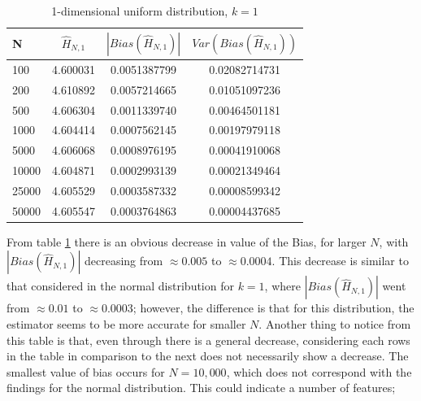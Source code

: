 \documentclass{article}
\begin{document}
\begin{table}
\caption{1-dimensional uniform distribution, $k=1$} \label{uniform_k=1_table}
\begin{center}
\begin{tabular}{| l | c c c|} 
\toprule
N & $\hat{H}_{N, 1}$ & $|Bias(\hat{H}_{N, 1})|$ & $Var(Bias(\hat{H}_{N, 1}))$ \\
\midrule[1pt]
100     & 4.600031     & 0.0051387799     & 0.02082714731  \\
200     & 4.610892     & 0.0057214665     & 0.01051097236  \\
500     & 4.606304     & 0.0011339740     & 0.00464501181  \\
1000    & 4.604414     & 0.0007562145     & 0.00197979118  \\
5000    & 4.606068     & 0.0008976195     & 0.00041910068  \\
10000   & 4.604871     & 0.0002993139     & 0.00021349464  \\
25000   & 4.605529     & 0.0003587332     & 0.00008599342  \\
50000   & 4.605547     & 0.0003764863     & 0.00004437685  \\
\hline
\end{tabular}
\end{center}
\end{table}

From table \ref{uniform_k=1_table} there is an obvious decrease in value of the Bias, for larger $N$, with $|Bias(\hat{H}_{N, 1})|$ decreasing from $\approx 0.005$ to $\approx 0.0004$. This decrease is similar to that considered in the normal distribution for $k=1$, where $|Bias(\hat{H}_{N, 1})|$ went from $\approx 0.01$ to $\approx 0.0003$; however, the difference is that for this distribution, the estimator seems to be more accurate for smaller $N$. Another thing to notice from this table is that, even through there is a general decrease, considering each rows in the table in comparison to the next does not necessarily show a decrease. The smallest value of bias occurs for $N=10,000$, which does not correspond with the findings for the normal distribution. This could indicate a number of features;
\end{document}
